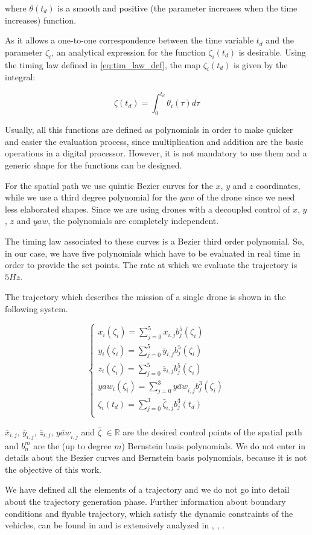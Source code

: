 where $ \theta( t_d ) $ is a smooth and positive (the parameter increases when
the time increases) function.

As it allows a one-to-one correspondence between the time
variable $t_d$ and the parameter $ \zeta_i $, an analytical expression
for the function $ \zeta_i (t_d) $ is desirable.
Using the timing law defined in \eqref{eq:tim_law_def}, the map $ \zeta_i ( t_d) $
is given by the integral:

\begin{equation}  \label{eq:zeta_law_def}
  \zeta( t_d ) = \int^{t_d}_0 \theta_i(\tau) d \tau
\end{equation}

Usually, all this functions are defined as polynomials in order to make quicker and
easier the evaluation process, since multiplication and addition are the basic
operations in a digital processor. However, it is not mandatory to use them and a
generic shape for the functions can be designed.

For the spatial path we use quintic Bezier curves for the $x$, $y$ and $z$ coordinates,
while we use a third degree polynomial for the $yaw$ of the drone since we need less
elaborated shapes.
Since we are using drones with a decoupled control of $x$, $y$, $z$ and $yaw$, the
polynomials are completely independent.

The timing law associated to these curves is a Bezier third order polynomial.
So, in our case, we have five polynomials which have to be evaluated in real time
in order to provide the set points. The rate at which we evaluate the trajectory
is $5 Hz$.

The trajectory which describes the mission of a single drone is shown in the
following system.

\[
  \begin{cases}
    x_i(\zeta_i) = \sum_{j=0}^{5}{\bar{x}_{i,j} b_j^5(\zeta_i)}\\
    y_i(\zeta_i) = \sum_{j=0}^{5}{\bar{y}_{i,j} b_j^5(\zeta_i)}\\
    z_i(\zeta_i) = \sum_{j=0}^{5}{\bar{z}_{i,j} b_j^5(\zeta_i)}\\
    yaw_i(\zeta_i) = \sum_{j=0}^{3}{\bar{yaw}_{i,j} b_j^3(\zeta_i)}\\
    \zeta_i(t_d) = \sum_{j=0}^{3}{\bar{\zeta}_{i,j} b_j^3(t_d)}\\
  \end{cases}
\]

$\bar{x}_{i,j}$, $\bar{y}_{i,j}$, $\bar{z}_{i,j}$, $\bar{yaw}_{i,j}$ and $\bar{\zeta}$ $\in \mathbb{R}$
are the desired control points of the spatial path and $b_n^m$ are the (up to degree $m$)
Bernstein basis polynomials.
We do not enter in details about the Bezier curves and Bernstein basis polynomials,
because it is not the objective of this work.

We have defined all the elements of a trajectory and we do not go into detail
about the trajectory generation phase.
Further information about boundary conditions and flyable trajectory, which satisfy
the dynamic constraints of the vehicles, can be found in \cite{cichellaMain} and
is extensively analyzed in \cite{trajGeneration1}, \cite{trajGeneration2},
\cite{trajGeneration3}.
